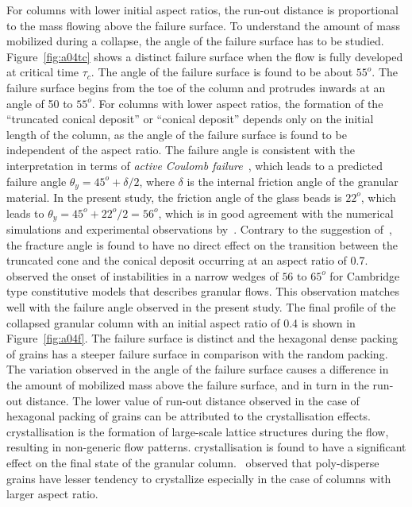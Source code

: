 For columns with lower initial aspect ratios, the run-out distance is 
proportional to the mass flowing above the failure surface. To understand the 
amount of mass mobilized during a collapse, the angle of the failure surface 
has to be studied. Figure~\ref{fig:a04tc} shows a distinct failure surface 
when the flow is fully developed at critical time $\tau_{\textit{c}}$. The 
angle of the failure surface is found to be about $55^{o}$. The failure surface 
begins from the toe of the column and protrudes inwards at an angle of 50 to 
$55^{o}$. For columns with lower aspect ratios, the formation of the 
``truncated conical deposit'' or ``conical deposit'' depends only on the 
initial length of the column, as the angle of the failure surface is found to 
be independent of the aspect ratio. The failure angle is consistent with the 
interpretation in terms of \textit{active Coulomb 
failure}~\citep{Lajeunesse2004}, which leads to a predicted failure angle 
$\theta_{\textit{y}}=45^{o}+\delta / 2$, where $\delta$ is the internal 
friction angle of the granular material. In the present study, the friction 
angle of the glass beads is $22^{o}$, which leads to 
$\theta_{\textit{y}}=45^{o}+22^{o}/ 2=56^{o}$, which is in good agreement with 
the numerical simulations and experimental observations 
by~\citet{Lajeunesse2004}. Contrary to the suggestion 
of~\citet{Lajeunesse2004}, the fracture angle is found to have no direct effect 
on the transition between the truncated cone and the conical deposit occurring 
at an aspect ratio of 0.7.~\citet{Schaeffer1990} observed the onset of 
instabilities in a narrow wedges of $56\mbox{ to }65^{o}$ for Cambridge type 
constitutive models that describes granular flows. This observation matches 
well with the failure angle observed in the present study. The final profile of 
the collapsed granular column with an initial aspect ratio of 0.4 is shown in 
Figure~\ref{fig:a04f}. The failure surface is distinct and the hexagonal dense 
packing of grains has a steeper failure surface in comparison with the random 
packing. The variation observed in the angle of the failure surface causes a 
difference in the amount of mobilized mass above the failure surface, and in 
turn in the run-out distance. The lower value of run-out distance observed in 
the case of hexagonal packing of grains can be attributed to the 
crystallisation effects. crystallisation is the formation of large-scale 
lattice structures during the flow, resulting in non-generic flow patterns. 
crystallisation is found to have a significant effect on the final state of the 
granular column.~\citet{Lacaze2009} observed that poly-disperse grains have 
lesser tendency to crystallize especially in the case of columns with larger 
aspect ratio. 


